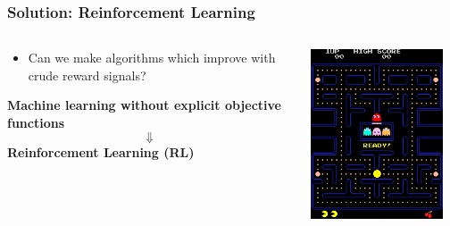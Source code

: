 \begin{frame}
  \frametitle{Solution: Reinforcement Learning}
  \begin{columns}
    \begin{column}{0.5\textwidth}
      \begin{itemize}
        \item<1-> Can we make algorithms which improve with crude reward signals?
      \end{itemize}
       \begin{center}
        \textbf{Machine learning without explicit objective functions}
        \begin{equation*}
        	\Downarrow
        \end{equation*}
        \textbf{Reinforcement Learning (RL)}
        \end{center}
    \end{column}
    \begin{column}{0.5\textwidth}
    \includegraphics[width=0.9\textwidth]{Pac-man.png}
    \end{column}
  \end{columns}
\end{frame}
